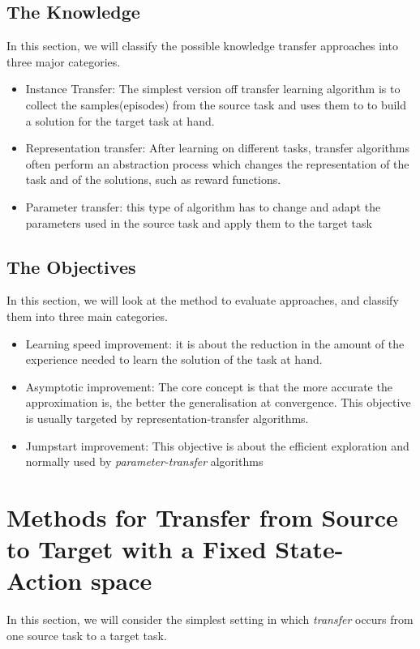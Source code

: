 \documentclass{article}
\begin{document}
\subsection{The Knowledge}
In this section, we will classify the possible knowledge transfer approaches into three major categories.

\begin{itemize}
    \item Instance Transfer: The simplest version off transfer learning algorithm is to collect the samples(episodes) from the source task and uses them to to build a solution for the target task at hand.
    \item Representation transfer: After learning on different tasks, transfer algorithms often perform an abstraction process which changes the representation of the task and of the solutions, such as reward functions.
    \item Parameter transfer: this type of algorithm has to change and adapt the parameters used in the source task and apply them to the target task
\end{itemize}

\subsection{The Objectives}
In this section, we will look at the method to evaluate approaches, and classify them into three main categories.

\begin{itemize}
    \item Learning speed improvement: it is about the reduction in the amount of the experience needed to learn the solution of the task at hand.
    \item Asymptotic improvement: The core concept is that the more accurate the approximation is, the better the generalisation at convergence. This objective is usually targeted by representation-transfer algorithms.
    \item Jumpstart improvement: This objective is about the efficient exploration and normally used by \textit{parameter-transfer} algorithms
\end{itemize}

\section{Methods for Transfer from Source to Target with a Fixed State-Action space}
In this section, we will consider the simplest setting in which \textit{transfer} occurs from one source task to a target task.
\end{document}
